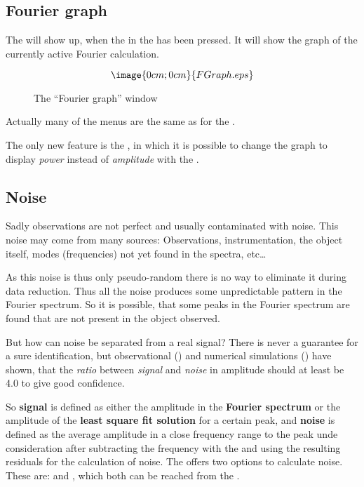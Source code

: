 \subsection{Fourier graph}%
\label{fourier.graph}
The  will show up,
when the  in the
 has been pressed.
It will show the graph of the currently active Fourier calculation.
\begin{figure}[h]
$$\image{0cm;0cm}{FGraph.eps}$$%
\caption{The ``Fourier graph'' window}%
\label{fourier.graph.window}
\end{figure}

Actually many of the menus are the same as for the
.

The only new feature is the , in which it is
possible to change the graph to display {\it power} instead of {\it amplitude}
with the .

\subsection{Noise}%
\label{fourier.noise}
Sadly observations are not perfect and usually contaminated with noise.
This noise may come from many sources: Observations, instrumentation,
the object itself, modes (frequencies) not yet found in the spectra, etc\ldots

As this noise is thus only pseudo-random there is no way to eliminate 
it during data reduction.
Thus all the noise produces some unpredictable pattern in the Fourier spectrum.
So it is possible, that some peaks in the Fourier spectrum are found that
are not present in the object observed.

But how can noise be separated from a real signal?
There is never a guarantee for a sure identification, 
but observational
()
and numerical simulations
()
have shown, that the {\it ratio} between {\it signal} and {\it noise} in 
amplitude should at least be 4.0 to give good confidence.

So {\bf signal} is defined as either 
the amplitude in the {\bf Fourier spectrum}
or the amplitude of the {\bf least square fit solution}
for a certain peak, and {\bf noise} is defined as the average amplitude
in a close frequency range to the peak unde consideration
after subtracting the frequency with the 
and using the resulting residuals for the calculation of noise.
The  offers two options 
to calculate noise.
These are:
and
,
which both can be reached from the .


